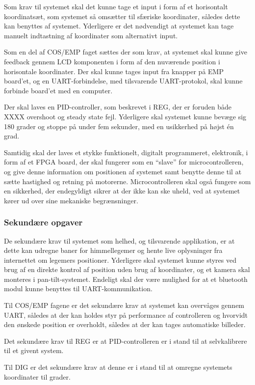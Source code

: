 Som krav til systemet skal det kunne tage et input i form af et horisontalt koordinatsæt, som systemet så omsætter til sfæriske koordinater, således dette kan benyttes af systemet. Yderligere er det nødvendigt at systemet kan tage manuelt indtastning af koordinater som alternativt input.

Som en del af COS/EMP faget sættes der som krav, at systemet skal kunne give feedback gennem LCD komponenten i form af den nuværende position i horisontale koordinater. Der skal kunne tages input fra knapper på EMP board'et, og en UART-forbindelse, med tilsvarende UART-protokol, skal kunne forbinde board'et med en computer.

Der skal laves en PID-controller, som beskrevet i REG, der er foruden både XXXX overshoot og steady state fejl. Yderligere skal systemet kunne bevæge sig 180 grader og stoppe på under fem sekunder, med en usikkerhed på højst én grad.

Samtidig skal der laves et stykke funktionelt, digitalt programmeret, elektronik, i form af et FPGA board, der skal fungerer som en ``slave'' for microcontrolleren, og give denne information om positionen af systemet samt benytte denne til at sætte hastighed og retning på motorerne. Microcontrolleren skal også fungere som en sikkerhed, der endegyldigt sikrer at der ikke kan ske uheld, ved at systemet kører ud over sine mekaniske begrænsninger.

\subsubsection{Sekundære opgaver}

De sekundære krav til systemet som helhed, og tilsvarende applikation, er at dette kan udregne baner for himmellegemer og hente live oplysninger fra internettet om legemers positioner. Yderligere skal systemet kunne styres ved brug af en direkte kontrol af position uden brug af koordinater, og et kamera skal monteres i pan-tilt-systemet. Endeligt skal der være mulighed for at et bluetooth modul kunne benyttes til UART-kommunikation.

Til COS/EMP fagene er det sekundære krav at systemet kan overvåges gennem UART, således at der kan holdes styr på performance af controlleren og hvorvidt den ønskede position er overholdt, således at der kan tages automatiske billeder.

Det sekundære krav til REG er at PID-controlleren er i stand til at selvkalibrere til et givent system.

Til DIG er det sekundære krav at denne er i stand til at omregne systemets koordinater til grader.
